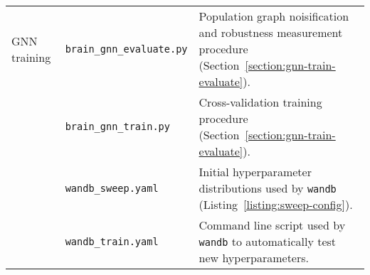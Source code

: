 \begin{center}
\begin{longtable}[]{p{}p{}p{}}
    GNN training
            & \texttt{brain\_gnn\_evaluate.py} & Population graph noisification and robustness measurement procedure (Section~\ref{section:gnn-train-evaluate}). \\
            & \texttt{brain\_gnn\_train.py} & Cross-validation training procedure (Section~\ref{section:gnn-train-evaluate}). \\
            & \texttt{wandb\_sweep.yaml} & Initial hyperparameter distributions used by \texttt{wandb} (Listing~\ref{listing:sweep-config}). \\
            & \texttt{wandb\_train.yaml} & Command line script used by \texttt{wandb} to automatically test new hyperparameters. \\
\end{longtable}
\end{center}